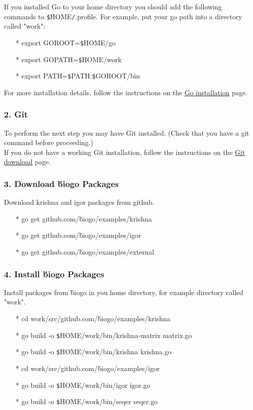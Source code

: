 \documentclass[12pt]{report}
\begin{document}
\noindent If you installed Go to your home directory you should add the following commands to \texttt{\$}HOME\texttt{/}.profile. For example, put your go path into a directory called "work":

\begin{enumerate}
	\item[*] export GOROOT=\texttt{\$}HOME/go
	\item[*] export GOPATH=\texttt{\$}HOME/work
	\item[*] export PATH=\texttt{\$}PATH:\texttt{\$}GOROOT/bin
	
\end{enumerate}

For more installation details, follow the instructions on the \href{https://golang.org/doc/install#install} {\color{blue}Go installation} page.


\subsubsection{2. Git}
To perform the next step you may have Git installed. (Check that you have a git command before proceeding.) \\

If you do not have a working Git installation, follow the instructions on the \href{https://git-scm.com/downloads}{\color{blue}Git download} page.

\subsubsection{3. Download \'biogo Packages}
Download krishna and igor packages from github.

\begin{enumerate}
\item[*] go get github.com/\'biogo/examples/krishna
\item[*] go get github.com/\'biogo/examples/igor
\item[*] go get github.com/\'biogo/examples/external
\end{enumerate}

\subsubsection{4. Install \'biogo Packages}
Install packages from \'biogo in you home directory, for example directory called "work".

\begin{enumerate}
	\item[*] cd work/src/github.com/\'biogo/examples/krishna
	\item[*] go build -o \texttt{\$}HOME/work/bin/krishna-matrix matrix.go
	\item[*] go build -o \texttt{\$}HOME/work/bin/krishna krishna.go
	\item[*] cd work/src/github.com/\'biogo/examples/igor
	\item[*] go build -o \texttt{\$}HOME/work/bin/igor igor.go
	\item[*] go build -o \texttt{\$}HOME/work/bin/seqer seqer.go
\end{enumerate}
\end{document}
